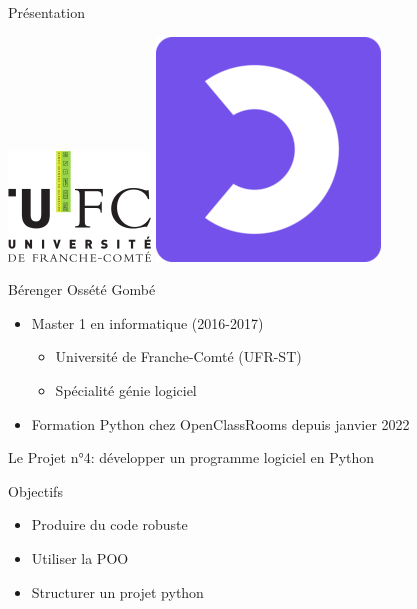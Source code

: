 \begin{frame}{Présentation}

  \begin{center}
    \includegraphics[scale=0.5]{img/logo_ufc.png}
    \hspace{1em}
    \includegraphics[scale=0.3]{img/logo_ocr.png}
  \end{center}
  
  \begin{block}{Bérenger Ossété Gombé}
    \begin{itemize}
    \item Master 1 en informatique (2016-2017)
      \begin{itemize}
      \item Université de Franche-Comté (UFR-ST)
      \item Spécialité génie logiciel
      \end{itemize}
    \item Formation Python chez OpenClassRooms depuis janvier 2022
    \end{itemize}    
  \end{block}
\end{frame}

\begin{frame}{Le Projet n°4: développer un programme logiciel en Python}

  \begin{block}{Objectifs}
    \begin{itemize}
    \item Produire du code robuste
    \item Utiliser la POO
    \item Structurer un projet python
    \end{itemize}
  \end{block}
\end{frame}

